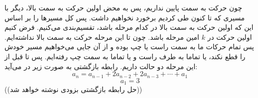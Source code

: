 \p
چون حرکت به سمت پایین نداریم، پس به محض اولین حرکت به سمت بالا، دیگر با مسیری که تا کنون طی کردیم برخورد نخواهیم داشت. پس کل مسیرها را بر اساس این که اولین حرکت به سمت بالا در کدام مرحله باشد، تقسیم‌بندی می‌کنیم. فرض کنیم اولین حرکت در
$k$
امین مرحله باشد. چون تا این مرحله حرکت به سمت بالا نداشته‌ایم. پس تمام حرکات ما به سمت راست یا چپ بوده و از آن جایی می‌خواهیم مسیر خودش را قطع نکند، یا تماما به طرف راست و یا تماما به سمت چپ رفته‌ایم. پس تا قبل از این مرحله دو حالت داریم. رابطه بازگشتی به صورت زیر در می‌آید:
$$a_n = a_{n-1} + 2a_{n-2} + 2a_{n-3} + \cdots + a_1$$
$$a_1 = 3$$
((حل رابطه بازگشتی بزودی نوشته خواهد شد))